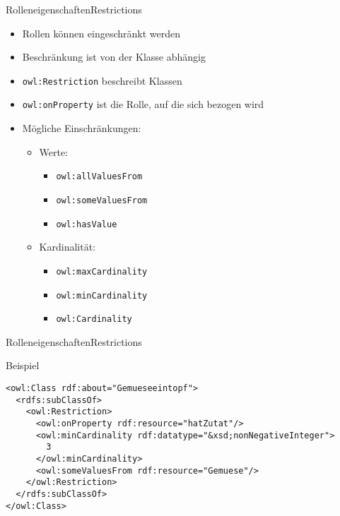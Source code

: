\documentclass{beamer}
\begin{document}
\begin{frame}[fragile]{Rolleneigenschaften}{Restrictions}
\begin{itemize}
\item Rollen können eingeschränkt werden
\item Beschränkung ist von der Klasse abhängig
\item \texttt{owl:Restriction} beschreibt Klassen
\item \texttt{owl:onProperty} ist die Rolle, auf die sich bezogen wird
\item Mögliche Einschränkungen:
\begin{itemize}
\item Werte:
\begin{itemize}
\item \texttt{owl:allValuesFrom}
\item \texttt{owl:someValuesFrom}
\item \texttt{owl:hasValue}
\end{itemize}
\item Kardinalität:
\begin{itemize}
\item \texttt{owl:maxCardinality}
\item \texttt{owl:minCardinality}
\item \texttt{owl:Cardinality}
\end{itemize}

\end{itemize}

\end{itemize}


\end{frame}
%

\begin{frame}[fragile]{Rolleneigenschaften}{Restrictions}
\begin{exampleblock}{Beispiel}
\begin{lstlisting}[lang="xml"]
<owl:Class rdf:about="Gemueseeintopf">
  <rdfs:subClassOf>
    <owl:Restriction>
      <owl:onProperty rdf:resource="hatZutat"/>
      <owl:minCardinality rdf:datatype="&xsd;nonNegativeInteger">
        3
      </owl:minCardinality>
      <owl:someValuesFrom rdf:resource="Gemuese"/>
    </owl:Restriction>
  </rdfs:subClassOf>
</owl:Class>
\end{lstlisting}
\end{exampleblock}
\end{frame}
\end{document}
